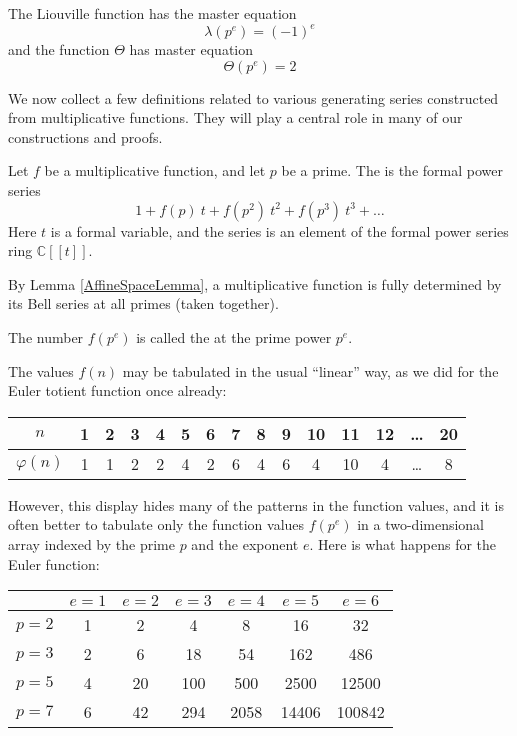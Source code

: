 \begin{example}
The Liouville function has the master equation
$$ \lambda(p^e) = (-1)^e  $$
and the function $\Theta$ has master equation
$$ \Theta(p^e) = 2   $$
\end{example}

We now collect a few definitions related to various generating series constructed from multiplicative functions. They will play a central role in many of our constructions and proofs.

\begin{definition}
Let $f$ be a multiplicative function, and let $p$ be a prime. The  is the formal power series
$$ 1 + f(p) \ t + f(p^2) \ t^2 + f(p^3) \ t^3 + \ldots    $$
Here $t$ is a formal variable, and the series is an element of the formal power series ring $\mathbb{C}[[t]]$.
\end{definition}

\begin{remark}
By Lemma \ref{AffineSpaceLemma}, a multiplicative function is fully determined by its Bell series at all primes (taken together).
\end{remark}

\begin{definition}
The number $f(p^e)$ is called the  at the prime power $p^e$.
\end{definition}

The values $f(n)$ may be tabulated in the usual ``linear'' way, as we did for the Euler totient function once already:

\vspace{6pt}
\begin{tabular}{  | c || c | c | c | c | c | c | c | c | c | c | c | c | c | c |  }
  \hline
  $n$ & 1 & 2 & 3 & 4 & 5 & 6 & 7 & 8 & 9 & 10 & 11 & 12 & \ldots & 20  \\
  \hline
  $\varphi(n) $ & 1 & 1 & 2 & 2 & 4 & 2 & 6 & 4 & 6 & 4 & 10 & 4 & \ldots & 8  \\
  \hline
\end{tabular}
\vspace{6pt}

However, this display hides many of the patterns in the function values, and it is often better to tabulate only the function values $f(p^e)$ in a two-dimensional array indexed by the prime $p$ and the exponent $e$. Here is what happens for the Euler function:

\begin{center}
\begin{tabular}{| l | | c | c | c | c | c | c |}
\hline
& $e = 1$ & $e = 2$ & $e = 3$ & $e = 4$ & $e = 5$ & $e = 6$ \\
\hline
\hline
$p = 2$ & 1 & 2 & 4 & 8 & 16 & 32 \\
\hline
$p = 3$ & 2 & 6 & 18 & 54 & 162 & 486 \\
\hline
$p = 5$ & 4 & 20 & 100 & 500 & 2500 & 12500 \\
\hline
$p = 7$ & 6 & 42 & 294 & 2058 & 14406 & 100842 \\
\hline
\end{tabular}
\end{center}

